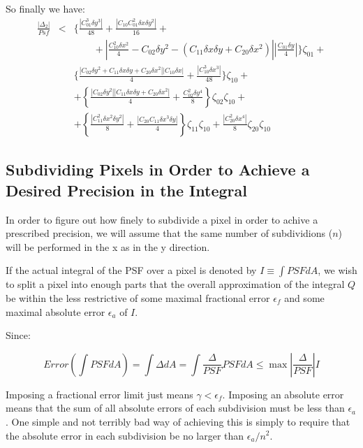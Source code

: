 \documentclass{article}
\begin{document}
So finally we have:
\begin{eqnarray}
	\frac{|\Delta_2|}{Psf}&<&
%
	\Bigg\{\frac{\left|C_{01}^3\delta y^3\right|}{48}+
		\frac{\left|C_{10}C_{01}^2\delta x\delta y^2\right|}{16}+
	\nonumber\\&&\quad\quad
		{}+\left|\frac{C_{10}^2\delta x^2}{4} - C_{02}\delta y^2
			-\left(C_{11}\delta x\delta y+C_{20}\delta x^2\right)
		\right|\left|\frac{C_{01}\delta y}{4}\right|\Bigg\}\zeta_{01}+
%
	\nonumber\\&&
	\Bigg\{
		\frac{\left|C_{02}\delta y^2 + C_{11}\delta x\delta y +
		C_{20}\delta x^2\right|\left|C_{10}\delta x\right|}{4}+
		\frac{\left|C_{10}^3\delta x^3\right|}{48}
	\Bigg\}\zeta_{10}+
%
	\nonumber\\&&
	+\left\{\frac{\left|C_{02}\delta y^2\right|
	\left|C_{11}\delta x\delta y+C_{20}\delta x^2\right|}{4}+
	\frac{C_{02}^2\delta y^4}{8}
	\right\}\zeta_{02}\zeta_{10}+
%
	\nonumber\\&&
	+\left\{\frac{\left|C_{11}^2\delta x^2 \delta y^2\right|}{8}+
	\frac{\left|C_{20}C_{11}\delta x^3 \delta y\right|}{4}\right\}
	\zeta_{11}\zeta_{10}
	+\frac{\left|C_{20}^2\delta x^4\right|}{8}\zeta_{20}\zeta_{10}
\end{eqnarray}

\subsection{Subdividing Pixels in Order to Achieve a Desired Precision in the
Integral}

In order to figure out how finely to subdivide a pixel in order to achive a 
prescribed precision, we will assume that the same number of subdividions 
($n$) will be performed in the x as in the y direction.

If the actual integral of the PSF over a pixel is denoted by $I\equiv\int PSF
dA$, we wish to split a pixel into enough parts that the overall
approximation of the integral $Q$ be within the less restrictive of some
maximal fractional error $\epsilon_f$ and some maximal absolute error
$\epsilon_a$ of $I$.

Since:

\begin{equation}
	Error(\int PSF dA)= \int\Delta dA = \int \frac{\Delta}{PSF} PSF dA
	\le \max\left|\frac{\Delta}{PSF}\right| I
\end{equation}

Imposing a fractional error limit just means $\gamma<\epsilon_f$. Imposing an
absolute error means that the sum of all absolute errors of each subdivision
must be less than $\epsilon_a$. One simple and not terribly bad way of
achieving this is simply to require that the absolute error in each
subdivision be no larger than $\epsilon_a/n^2$.
\end{document}
